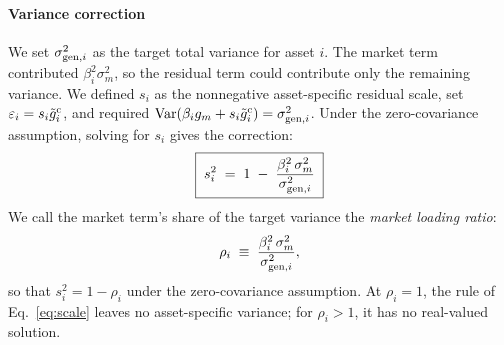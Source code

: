 \paragraph{Variance correction}

We set $\sigma_{\mathrm{gen},i}^2$ as the target total variance for asset $i$.
The market term contributed $\beta_i^2\sigma_m^2$, so the residual term
could contribute only the remaining variance. We defined $s_i$ as the
nonnegative asset-specific residual scale, set
$\varepsilon_i=s_i\tilde{g}_i^{\mathrm c}$, and required
$\operatorname{Var}(\beta_i g_m+s_i\tilde{g}_i^{\mathrm c})=\sigma_{\mathrm{gen},i}^2$. Under the
zero-covariance assumption, solving for $s_i$ gives the correction:
\begin{equation}
  \boxed{\;s_i^2 \;=\; 1 \;-\; \frac{\beta_i^2\, \sigma_m^2}{\sigma_{\mathrm{gen},i}^2}\;}
  \label{eq:scale}
\end{equation}
We call the market term's share of the target variance the
\emph{market loading ratio}:
\begin{equation}
  \rho_i \;\equiv\; \frac{\beta_i^2\, \sigma_m^2}{\sigma_{\mathrm{gen},i}^2},
  \label{eq:rho}
\end{equation}
so that $s_i^2=1-\rho_i$ under the zero-covariance assumption. At
$\rho_i=1$, the rule of Eq.~\eqref{eq:scale} leaves no asset-specific
variance; for $\rho_i>1$, it has no real-valued solution.

